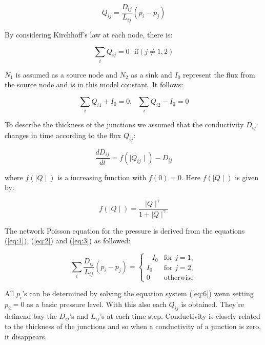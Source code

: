 \documentclass[11pt]{article}
\begin{document}
\begin{equation}
	\label{eq:1}
	Q_{ij}=\frac{D_{ij}}{L_{ij}}\left(p_i-p_j\right)
\end{equation}

By considering Kirchhoff's law at each node, there is:

\begin{equation}
	\label{eq:2}
	\sum_{i} Q_{ij}=0 \,\,\,\, \mathrm{if} \left(j\ne 1,2\right)
\end{equation}

$N_1$ is assumed as a source node and $N_2$ as a sink and $I_0$ represent the flux from the source node and is in this model constant. It follows:

\begin{equation}
	\label{eq:3}
	\sum_{i} Q_{i1}+I_0=0, \,\,\,\, \sum_{i} Q_{i2}-I_0=0
\end{equation}

To describe the thickness of the junctions we assumed that the conductivity $D_{ij}$ changes in time according to the flux $Q_{ij}$:

\begin{equation}
	\label{eq:4}
	\frac{dD_{ij}}{dt}=f\left(\mid Q_{ij} \mid \right)-D_{ij}
\end{equation}

where $f\left(\mid Q \mid \right)$ is a increasing function with $f(0)=0$. Here $f\left(\mid Q \mid \right)$ is given by:

\begin{equation}
	\label{eq:5}
	f\left(\mid Q \mid \right)=\frac{\mid Q \mid^\gamma }{1+\mid Q \mid^\gamma}
\end{equation}

The network Poisson equation for the pressure is derived from the equations (\ref{eq:1}), (\ref{eq:2}) and (\ref{eq:3}) as followed:

\begin{equation}
	\label{eq:6}
	\sum_{i} \frac{D_{ij}}{L_{ij}}\left(p_i-p_j\right)= \begin{cases}
										-I_0 & \mathrm{for}\,\, j=1,\\
										I_0 & \mathrm{for} \,\,j=2,\\
										0 & \mathrm{otherwise}
										\end{cases}
\end{equation}

All $p_i$'s can be determined by solving the equation system (\ref{eq:6}) wenn setting $p_2=0$ as a basic pressure level. With this also each $Q_{ij}$ is obtained. They're definend bay the $D_{ij}$'s and $L_{ij}$'s  at each time step. Conductivity is closely related to the thickness of the junctions and so when a conductivity of a junction is zero, it disappears.
\end{document}
